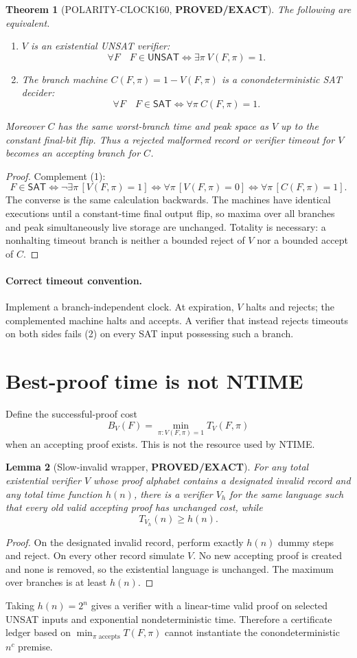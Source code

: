 \documentclass[11pt]{article}
\newtheorem{theorem}{Theorem}
\newtheorem{lemma}[theorem]{Lemma}
\newcommand{\status}[1]{\textbf{#1}}
\newcommand{\SAT}{\mathsf{SAT}}
\newcommand{\UNSAT}{\mathsf{UNSAT}}
\begin{document}
\begin{theorem}[POLARITY-CLOCK160, \status{PROVED/EXACT}]
The following are equivalent.
\begin{enumerate}
\item $V$ is an existential UNSAT verifier:
\[
 \forall F\quad F\in\UNSAT\iff\exists\pi\ V(F,\pi)=1.
 \tag{1}
\]
\item The branch machine $C(F,\pi)=1-V(F,\pi)$ is a conondeterministic SAT
decider:
\[
 \forall F\quad F\in\SAT\iff\forall\pi\ C(F,\pi)=1.
 \tag{2}
\]
\end{enumerate}
Moreover $C$ has the same worst-branch time and peak space as $V$ up to the
constant final-bit flip.  Thus a rejected malformed record or verifier timeout
for $V$ becomes an accepting branch for $C$.
\end{theorem}
\begin{proof}
Complement (1):
\[
F\in\SAT
\iff\neg\exists\pi\,[V(F,\pi)=1]
\iff\forall\pi\,[V(F,\pi)=0]
\iff\forall\pi\,[C(F,\pi)=1].
\]
The converse is the same calculation backwards.  The machines have identical
executions until a constant-time final output flip, so maxima over all branches
and peak simultaneously live storage are unchanged.  Totality is necessary:
a nonhalting timeout branch is neither a bounded reject of $V$ nor a bounded
accept of $C$.
\end{proof}

\paragraph{Correct timeout convention.}
Implement a branch-independent clock.  At expiration, $V$ halts and rejects;
the complemented machine halts and accepts.  A verifier that instead rejects
timeouts on both sides fails (2) on every SAT input possessing such a branch.

\section*{Best-proof time is not NTIME}
Define the successful-proof cost
\[
B_V(F)=\min_{\pi:V(F,\pi)=1}T_V(F,\pi)
\]
when an accepting proof exists.  This is not the resource used by NTIME.

\begin{lemma}[Slow-invalid wrapper, \status{PROVED/EXACT}]
For any total existential verifier $V$ whose proof alphabet contains a
designated invalid record and any total time function $h(n)$, there is a
verifier $V_h$ for the same language such that every old valid accepting proof
has unchanged cost, while
\[
T_{V_h}(n)\ge h(n).
\]
\end{lemma}
\begin{proof}
On the designated invalid record, perform exactly $h(n)$ dummy steps and
reject.  On every other record simulate $V$.  No new accepting proof is
created and none is removed, so the existential language is unchanged.  The
maximum over branches is at least $h(n)$.
\end{proof}
Taking $h(n)=2^n$ gives a verifier with a linear-time valid proof on selected
UNSAT inputs and exponential nondeterministic time.  Therefore a certificate
ledger based on $\min_{\pi\text{ accepts}}T(F,\pi)$ cannot instantiate the
conondeterministic $n^c$ premise.
\end{document}
